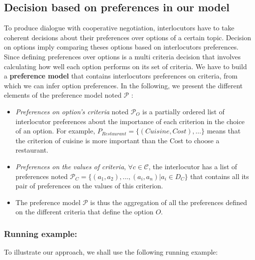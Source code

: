\documentclass{llncs}
\begin{document}
\subsection{Decision based on preferences in our model}
\label{scores}
\par To produce dialogue with cooperative negotiation, interlocutors have to take coherent decisions about their preferences over options of a certain topic. Decision on options imply comparing theses options based on interlocutors preferences.  
 Since defining preferences over options is a multi criteria decision that involves calculating how well each option performs on its set of criteria. We have to build a \textbf{preference model }that contains interlocutors preferences on criteria, from which we can infer option preferences.  
In the following, we present the different elements of the preference model noted \textbf{$\mathcal{P}$} : 
\begin{itemize}
	\item \textit{Preferences on option's criteria} noted $\mathcal{P}_O$ is a partially ordered list of interlocutor preferences about the importance of each criterion in the choice of an option. For example, $ P_{Restaurant} = \{(Cuisine, Cost), \ldots\} $
	means that the criterion of cuisine is more important than the Cost to choose a restaurant. 
	\item  \textit{Preferences on the values of criteria}, $\forall c \in \mathcal{C}$, the interlocutor has a list of preferences noted $\mathcal{P}_C = \{(a_1, a_2), ..., (a_i,a_n) | a_i \in D_C \}$ that contains all its pair of preferences on the values of this criterion. 
	\item The preference model \textbf{$\mathcal{P}$} is thus the aggregation of all the preferences defined on the different criteria that define the option $O$. 

\end{itemize}
 \subsubsection{Running example:} 
 To illustrate our approach, we shall use the following running example:
 
\end{document}
